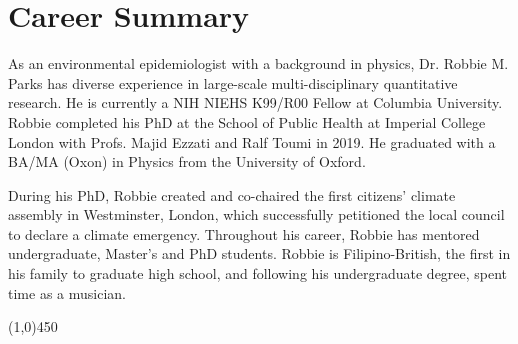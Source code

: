 \section*{Career Summary}

As an environmental epidemiologist with a background in physics, Dr. Robbie M. Parks has diverse experience in large-scale multi-disciplinary quantitative research. He is currently a NIH NIEHS K99/R00 Fellow at Columbia University. Robbie completed his PhD at the School of Public Health at Imperial College London with Profs. Majid Ezzati and Ralf Toumi in 2019. He graduated with a BA/MA (Oxon) in Physics from the University of Oxford. \medskip

\noindent During his PhD, Robbie created and co-chaired the first citizens’ climate assembly in Westminster, London, which successfully petitioned the local council to declare a climate emergency. Throughout his career, Robbie has mentored undergraduate, Master’s and PhD students. Robbie is Filipino-British, the first in his family to graduate high school, and following his undergraduate degree, spent time as a musician.

\begin{center} \line(1,0){450} \end{center}